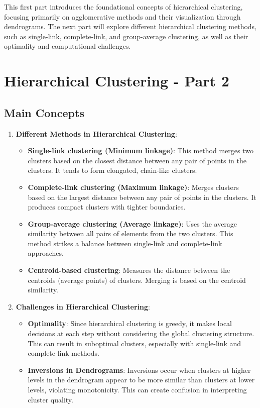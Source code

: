 \documentclass{article}
\begin{document}
\begin{enumerate}
This first part introduces the foundational concepts of hierarchical clustering, focusing primarily on agglomerative methods and their visualization through dendrograms. The next part will explore different hierarchical clustering methods, such as single-link, complete-link, and group-average clustering, as well as their optimality and computational challenges.

\section{Hierarchical Clustering - Part 2}

\subsection{Main Concepts}

\begin{enumerate}
    \item \textbf{Different Methods in Hierarchical Clustering}:
    \begin{itemize}
        \item \textbf{Single-link clustering (Minimum linkage)}: This method merges two clusters based on the closest distance between any pair of points in the clusters. It tends to form elongated, chain-like clusters.
        \item \textbf{Complete-link clustering (Maximum linkage)}: Merges clusters based on the largest distance between any pair of points in the clusters. It produces compact clusters with tighter boundaries.
        \item \textbf{Group-average clustering (Average linkage)}: Uses the average similarity between all pairs of elements from the two clusters. This method strikes a balance between single-link and complete-link approaches.
        \item \textbf{Centroid-based clustering}: Measures the distance between the centroids (average points) of clusters. Merging is based on the centroid similarity.
    \end{itemize}

    \item \textbf{Challenges in Hierarchical Clustering}:
    \begin{itemize}
        \item \textbf{Optimality}: Since hierarchical clustering is greedy, it makes local decisions at each step without considering the global clustering structure. This can result in suboptimal clusters, especially with single-link and complete-link methods.
        \item \textbf{Inversions in Dendrograms}: Inversions occur when clusters at higher levels in the dendrogram appear to be more similar than clusters at lower levels, violating monotonicity. This can create confusion in interpreting cluster quality.
    \end{itemize}


\end{enumerate}
\end{enumerate}
\end{document}
